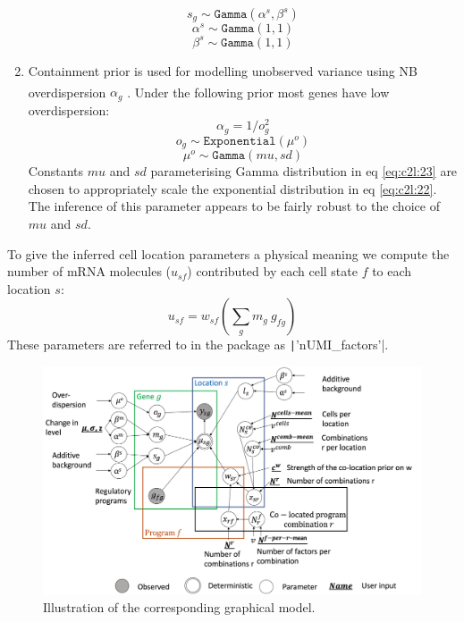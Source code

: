 \documentclass[11pt,a4paper]{article}
\begin{document}
\begin{enumerate}
    \begin{equation} \label{eq:c2l:18}
    s_{g} \sim \mathtt{Gamma}(\alpha^s,  \beta^s)
    \end{equation}
    \begin{equation} \label{eq:c2l:19}
    \alpha^s \sim \mathtt{Gamma}(1, 1)
    \end{equation}
    \begin{equation} \label{eq:c2l:20}
    \beta^s \sim \mathtt{Gamma}(1, 1)
    \end{equation}
    
    \item Containment prior is used for modelling unobserved variance using NB overdispersion $\alpha_g$ \textsuperscript{\cite{simpson_penalising_2017}}. Under the following prior most genes have low overdispersion:
    \begin{equation} \label{eq:c2l:21}
    \alpha_g = 1 / o_g ^ 2
    \end{equation}
    \begin{equation} \label{eq:c2l:22}
    o_g \sim \mathtt{Exponential}(\mu^o)
    \end{equation}
    \begin{equation} \label{eq:c2l:23}
    \mu^o \sim \mathtt{Gamma}(mu,  sd)
    \end{equation}
    Constants $mu$ and $sd$ parameterising Gamma distribution in eq \ref{eq:c2l:23} are chosen to appropriately scale the exponential distribution in eq \ref{eq:c2l:22}. The inference of this parameter appears to be fairly robust to the choice of $mu$ and $sd$.

\end{enumerate}


To give the inferred cell location parameters a physical meaning we compute the number of mRNA molecules ($u_{sf}$) contributed by each cell state $f$ to each location $s$:
\begin{equation} \label{eq:c2l:24}
u_{sf} = w_{sf} (\sum_{g} {m_{g} \: g_{fg}})
\end{equation}
These parameters are referred to in the package as \texttt|'nUMI_factors'|. \newline

\begin{figure}
    \includegraphics[scale=0.35]{images/CoLocationModelNB4V2.png}
    \caption{Illustration of the corresponding graphical model.}
    \label{fig:graphical_model}
\end{figure}
\end{document}
